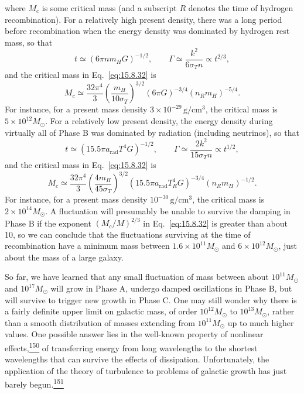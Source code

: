 where \(M_c\) is some critical mass (and a subscript \(R\) denotes the time
of hydrogen recombination). For a relatively high present density, there was
a long period before recombination when the energy density was dominated by
hydrogen rest mass, so that
\[
  t\simeq(6\pi nm_HG)^{-1/2},
  \qquad
  \Gamma\simeq\frac{k^2}{6\sigma_Tn}\propto t^{2/3},
\]
and the critical mass in Eq.~\eqref{eq:15.8.32} is
\begin{equation}
  M_c
  \simeq
  \frac{32\pi^4}{3}
  \left(\frac{m_H}{10\sigma_T}\right)^{3/2}
  (6\pi G)^{-3/4}
  (n_Rm_H)^{-5/4}.
  \tag{15.8.33}\label{eq:15.8.33}
\end{equation}
For instance, for a present mass density
\(3\times10^{-29}\,\mathrm{g/cm^3}\), the critical mass is
\(5\times10^{12}M_\odot\). For a relatively low present density, the energy
density during virtually all of Phase B was dominated by radiation (including
neutrinos), so that
\[
  t\simeq(15.5\pi a_{\mathrm{rad}}T^4G)^{-1/2},
  \qquad
  \Gamma\simeq\frac{2k^2}{15\sigma_Tn}\propto t^{1/2},
\]
and the critical mass in Eq.~\eqref{eq:15.8.32} is
\begin{equation}
  M_c
  \simeq
  \frac{32\pi^4}{3}
  \left(\frac{4m_H}{45\sigma_T}\right)^{3/2}
  (15.5\pi a_{\mathrm{rad}}T_R^4G)^{-3/4}
  (n_Rm_H)^{-1/2}.
  \tag{15.8.34}\label{eq:15.8.34}
\end{equation}
For instance, for a present mass density
\(10^{-30}\,\mathrm{g/cm^3}\), the critical mass is
\(2\times10^{14}M_\odot\). A fluctuation will presumably be unable to
survive the damping in Phase B if the exponent \((M_c/M)^{2/3}\) in
Eq.~\eqref{eq:15.8.32} is greater than about 10, so we can conclude that the
fluctuations surviving at the time of recombination have a minimum mass
between \(1.6\times10^{11}M_\odot\) and \(6\times10^{12}M_\odot\), just
about the mass of a large galaxy.

So far, we have learned that any small fluctuation of mass between about
\(10^{11}M_\odot\) and \(10^{17}M_\odot\) will grow in Phase A, undergo
damped oscillations in Phase B, but will survive to trigger new growth in
Phase C. One may still wonder why there is a fairly definite upper limit on
galactic mass, of order \(10^{12}M_\odot\) to \(10^{13}M_\odot\), rather
than a smooth distribution of masses extending from \(10^{11}M_\odot\) up
to much higher values. One possible answer lies in the well-known property of
nonlinear effects,\hyperref[ch15-ref-150]{\textsuperscript{150}} of
transferring energy from long wavelengths to the shortest wavelengths that
can survive the effects of dissipation. Unfortunately, the application of
the theory of turbulence to problems of galactic growth has just barely
begun.\hyperref[ch15-ref-151]{\textsuperscript{151}}

